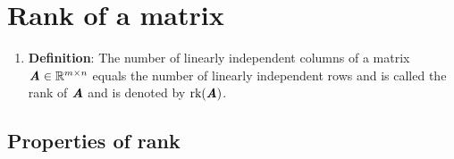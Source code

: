\section{Rank of a matrix}

\begin{enumerate}
    \item \textbf{Definition}: The number of linearly independent columns of a matrix $\text{\textbf{\textit{A}}} \in \mathbb{R}^{m\times n}$ equals the number of linearly independent rows and is called the rank of $\text{\textbf{\textit{A}}}$ and is denoted by $\text{rk}(\text{\textbf{\textit{A}}})$.
    \hfill \cite{mfml/book/mml/Deisenroth-Faisal-Ong}

\end{enumerate}


\subsection{Properties of rank}

